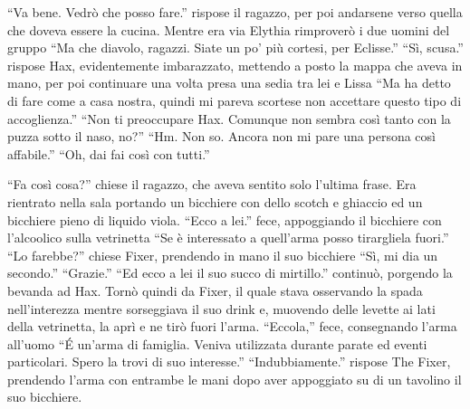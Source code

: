     ``Va bene. Vedrò che posso fare.'' rispose il ragazzo, per poi
    andarsene verso quella che doveva essere la cucina. Mentre era via
    Elythia rimproverò i due uomini del gruppo ``Ma che diavolo, ragazzi.
    Siate un po' più cortesi, per Eclisse.'' ``Sì, scusa.'' rispose Hax,
    evidentemente imbarazzato, mettendo a posto la mappa che aveva in mano,
    per poi continuare una volta presa una sedia tra lei e Lissa ``Ma ha detto di
    fare come a casa nostra, quindi mi pareva scortese non accettare questo
    tipo di accoglienza.'' ``Non ti preoccupare Hax. Comunque non sembra
    così tanto con la puzza sotto il naso, no?'' ``Hm. Non so. Ancora non
    mi pare una persona così affabile.'' ``Oh, dai fai così con tutti.''

    ``Fa così cosa?'' chiese il ragazzo, che aveva sentito solo l'ultima
    frase. Era rientrato nella sala portando un bicchiere con dello scotch
    e ghiaccio ed un bicchiere pieno di liquido viola. ``Ecco a lei.''
    fece, appoggiando il bicchiere con l'alcoolico sulla vetrinetta ``Se è
    interessato a quell'arma posso tirargliela fuori.'' ``Lo farebbe?''
    chiese Fixer, prendendo in mano il suo bicchiere ``Sì, mi dia un
    secondo.'' ``Grazie.'' ``Ed ecco a lei il suo succo di mirtillo.''
    continuò, porgendo la bevanda ad Hax. Tornò quindi da Fixer, il quale
    stava osservando la spada nell'interezza mentre sorseggiava il suo
    drink e, muovendo delle levette ai lati della vetrinetta, la aprì e ne
    tirò fuori l'arma. ``Eccola,'' fece, consegnando l'arma all'uomo ``\'E
    un'arma di famiglia. Veniva utilizzata durante parate ed eventi
    particolari. Spero la trovi di suo interesse.'' ``Indubbiamente.''
    rispose The Fixer, prendendo l'arma con entrambe le mani dopo aver
    appoggiato su di un tavolino il suo bicchiere.

